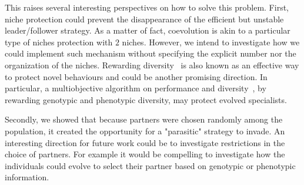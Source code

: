     This raises several interesting perspectives on how to solve this problem. First, niche protection could prevent the disappearance of the efficient but unstable leader/follower strategy. As a matter of fact, coevolution is akin to a particular type of niches protection with $2$ niches. However, we intend to investigate how we could implement such mechanism without specifying the explicit number nor the organization of the niches. Rewarding diversity~\cite{Lehman2008} is also known as an effective way to protect novel behaviours and could be another promising direction. In particular, a multiobjective algorithm on performance and diversity~\cite{Doncieux2014}, by rewarding genotypic and phenotypic diversity, may protect evolved specialists.

    Secondly, we showed that because partners were chosen randomly among the population, it created the opportunity for a "parasitic" strategy to invade. An interesting direction for future work could be to investigate restrictions in the choice of partners. For example it would be compelling to investigate how the individuals could evolve to select their partner based on genotypic or phenotypic information.
  